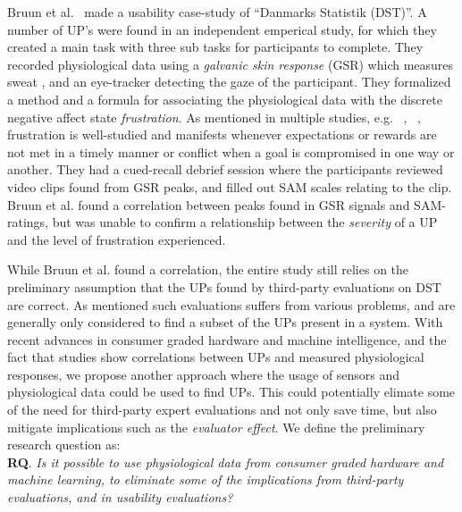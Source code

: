Bruun et al.~\cite{LH-paper} made a usability case-study of ``Danmarks Statistik (DST)''.
A number of UP's were found in an independent emperical study, for which they created a main task with three sub tasks for participants to complete.
They recorded physiological data using a \textit{galvanic skin response} (GSR) which measures sweat \cite{gsr_calibration}, and an eye-tracker detecting the gaze of the participant.
They formalized a method and a formula for associating the physiological data with the discrete negative affect state \textit{frustration}.
As mentioned in multiple studies, e.g. ~\cite{LH-paper}, ~\cite{frustration_with_computers}, frustration is well-studied
and manifests whenever expectations or rewards are not met in a timely manner or conflict when a goal is compromised in one way or another.
They had a cued-recall debrief session where the participants reviewed video clips found from GSR peaks, and filled out SAM scales relating to the clip. 
Bruun et al. found a correlation between peaks found in GSR signals and SAM-ratings, but was unable to confirm a relationship between the
\textit{severity} of a UP and the level of frustration experienced.

While Bruun et al. found a correlation, the entire study still relies on the preliminary assumption that the UPs found by third-party evaluations on DST are correct. 
As mentioned such evaluations suffers from various problems, and are generally only considered to find a subset of the UPs present in a system. 
With recent advances in consumer graded hardware and machine intelligence, and the fact that studies show correlations between UPs and measured physiological responses, we propose another approach where the usage of sensors and physiological data could be used to find UPs.
This could potentially elimate some of the need for third-party expert evaluations and not only save time, but also mitigate implications such as the \textit{evaluator effect}\cite{eval_effect}.
We define the preliminary research question as:\\

\textbf{RQ}. \textit{Is it possible to use physiological data from consumer graded hardware and machine learning, to
  eliminate some of the implications from third-party evaluations, and in usability evaluations?}

